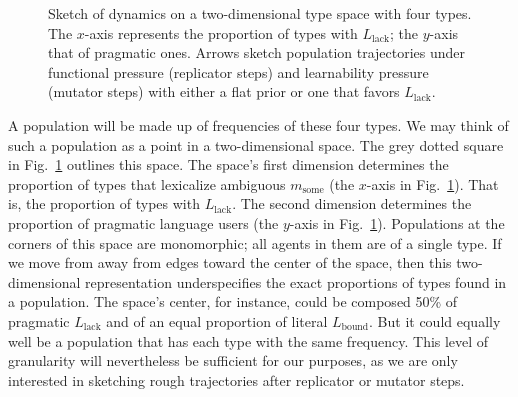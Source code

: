 \documentclass[a4paper, 11pt]{article}
\theoremstyle{Satz}
\newcommand{\mylang}[1]{\ensuremath{L_{\text{#1}}}\xspace} %
\newcommand{\messg}{\ensuremath{m}\xspace}		%
\newcommand{\mymessg}[1]{\ensuremath{\messg_{\text{#1}}}\xspace} %
\newcommand{\msome}{\mymessg{some}}
\newcommand{\Lbound}{\mylang{bound}}
\newcommand{\Llack}{\mylang{lack}}
\begin{document}
\begin{figure}
\caption{Sketch of dynamics on a two-dimensional type space with four types. The $x$-axis represents the proportion of types with $\Llack$; the $y$-axis that of pragmatic ones. Arrows sketch population trajectories under functional pressure (replicator steps) and learnability pressure (mutator steps) with either a flat prior or one that favors $\Llack$.}
\label{fig:sketch}
\end{figure}

A population will be made up of frequencies of these four types. We may think of such a population as a point in a two-dimensional space. The grey dotted square in Fig.~\ref{fig:sketch} outlines this space. The space's first dimension determines the proportion of types that lexicalize ambiguous $\msome$ (the $x$-axis in Fig.~\ref{fig:sketch}). That is, the proportion of types with $\Llack$. The second dimension determines the proportion of pragmatic language users (the $y$-axis in Fig.~\ref{fig:sketch}). Populations at the corners of this space are monomorphic; all agents in them are of a single type. If we move from away from edges toward the center of the space, then this two-dimensional representation underspecifies the exact proportions of types found in a population. The space's center, for instance, could be composed 50\% of pragmatic $\Llack$ and of an equal proportion of literal $\Lbound$. But it could equally well be a population that has each type with the same frequency. This level of granularity will nevertheless be sufficient for our purposes, as we are only interested in sketching rough trajectories after replicator or mutator steps. 
\end{document}
